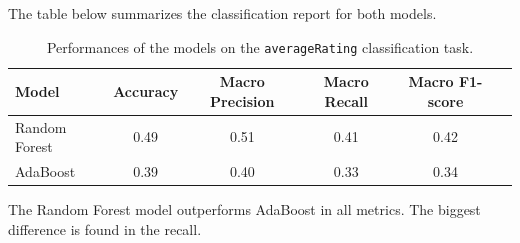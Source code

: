 The table below summarizes the classification report for both models.
\begin{table}[H]
    \centering
    \label{tab:classification_report}
    \begin{tabular}{lccccc}
    \hline
    \textbf{Model} & \textbf{Accuracy} & \textbf{Macro Precision} & \textbf{Macro Recall} & \textbf{Macro F1-score} \\
    \hline
    Random Forest & 0.49 & 0.51 & 0.41 & 0.42 \\
    AdaBoost & 0.39 & 0.40 & 0.33 & 0.34 \\
    \hline
    \end{tabular}
    \caption{Performances of the models on the \texttt{averageRating} classification task.}
\end{table}

The Random Forest model outperforms AdaBoost in all metrics.
The biggest difference is found in the recall.

